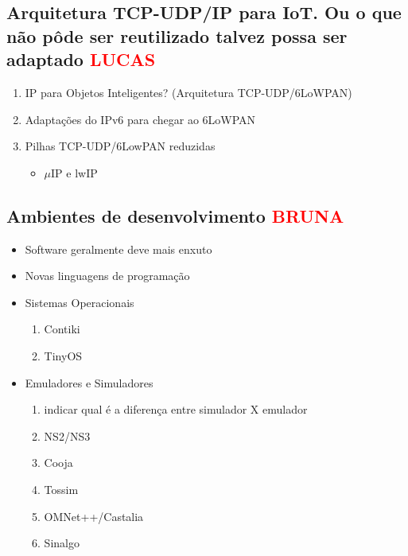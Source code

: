   \subsection{Arquitetura TCP-UDP/IP para IoT. Ou o que não pôde ser 
reutilizado talvez possa ser adaptado \textcolor{red}{LUCAS}}
    \begin{enumerate}
      \item IP para Objetos Inteligentes? (Arquitetura TCP-UDP/6LoWPAN)
      \item Adaptações do IPv6 para chegar ao 6LoWPAN
      \item Pilhas TCP-UDP/6LowPAN reduzidas
      \begin{itemize}
	\item $\mu$IP e lwIP
      \end{itemize}
    \end{enumerate}
  
  \subsection{Ambientes de desenvolvimento \textcolor{red}{BRUNA}}
    \begin{itemize}
      \item Software geralmente deve mais enxuto
      \item Novas linguagens de programação
      \item Sistemas Operacionais
	\begin{enumerate}
	  \item Contiki
	  \item TinyOS
	\end{enumerate}
      \item Emuladores e Simuladores
	\begin{enumerate}
	  \item indicar qual é a diferença entre simulador X emulador
	  \item NS2/NS3
	  \item Cooja 
	  \item Tossim
	  \item OMNet++/Castalia
	  \item Sinalgo
	\end{enumerate}
    \end{itemize}
    
